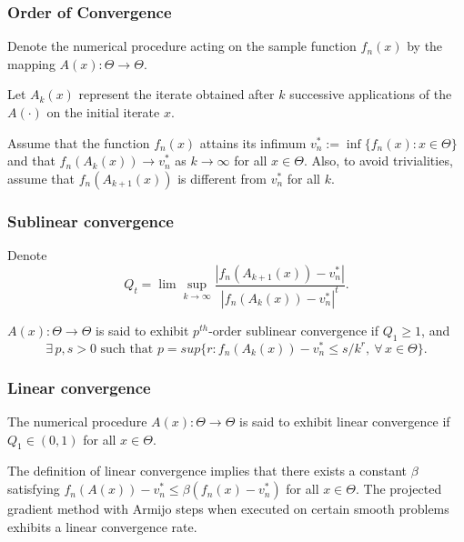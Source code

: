 \documentclass{beamer}
\begin{document}
\begin{frame}
\frametitle{Order of Convergence}

Denote the numerical procedure acting on the sample function $f_n(x)$ by the mapping
$A(x) : \Theta \rightarrow \Theta$.

\mbox{}

Let $A_k(x)$ represent the iterate obtained after $k$ successive applications
of the $A(\cdot)$ on the initial iterate $x$.

\mbox{}

Assume that the function $f_n(x)$ attains its infimum $v_n^{*} := \inf\{ f_n(x) : x \in \Theta\}$ and
that $f_n (A_k (x)) \rightarrow v_n^{*}$ as $k \rightarrow \infty$ for all $x \in \Theta$.
Also, to avoid trivialities, assume that
$f_n (A_{k+1} (x))$ is different from $v_n^*$ for all $k$.

\end{frame}

\begin{frame}
\frametitle{Sublinear convergence}

Denote
$$
Q_t = \lim \sup_{k \rightarrow \infty} \frac{ | f_n(A_{k+1} (x)) - v_n^* |}
{| f_n (A_k (x)) - v_n^* |^t}.
$$

\mbox{}

\begin{definition}
$A(x) : \Theta \rightarrow \Theta$ is said to exhibit $p^{th}$-order
sublinear convergence if $Q_1 \geq 1$, and
$$
\exists\,p, s > 0 \text{ such that } p = sup \{r : f_n(A_k (x)) - v^*_n \leq s/k^r,\ \forall\, x \in \Theta\}.
$$
\end{definition}

\end{frame}

\begin{frame}
\frametitle{Linear convergence}

\begin{definition}
The numerical procedure $A(x) : \Theta \rightarrow \Theta$ is said to exhibit linear convergence if $Q_1 \in (0, 1)$ for all $x \in \Theta$.
\end{definition}

\mbox{}

The definition of linear convergence implies that there exists a constant $\beta$ satisfying $f_n ( A (x)) - v_n^* \leq \beta (f_n(x) - v_n^*)$ for all $x \in \Theta$.
The projected gradient method with Armijo steps when executed on certain smooth problems exhibits a linear convergence rate.

\end{frame}
\end{document}
